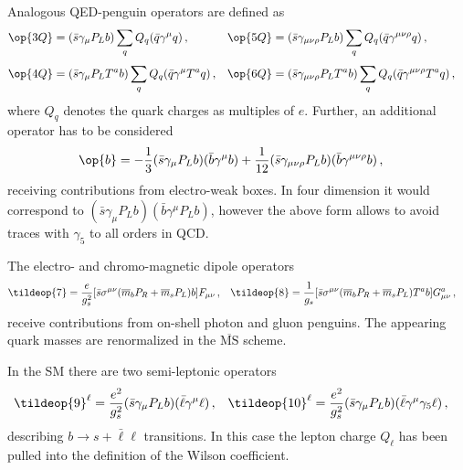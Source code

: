 Analogous QED-penguin operators are defined as 
\begin{equation}
\begin{aligned}
  \op{3Q} & = (\bar{s} \gamma_\mu P_L b)     \sum_q Q_q (\bar{q} \gamma^\mu q) \,, & 
  \op{5Q} & = (\bar{s} \gamma_{\mu\nu\rho} P_L b)
             \sum_q Q_q (\bar{q} \gamma^{\mu\nu\rho} q) \,, &
\\[1mm]   
  \op{4Q} & = (\bar{s} \gamma_\mu P_L T^a b) \sum_q Q_q (\bar{q} \gamma^\mu T^a q) \,, &
  \op{6Q} & = (\bar{s} \gamma_{\mu\nu\rho} P_L T^a b) 
             \sum_q Q_q (\bar{q} \gamma^{\mu\nu\rho} T^a q) \,,
\end{aligned}
\end{equation}
where $Q_q$ denotes the quark charges as multiples of $e$. Further, an additional
operator has to be considered
\begin{align}
  \op{b} & = -\frac{1}{3}  (\bar{s} \gamma_\mu P_L b)(\bar{b} \gamma^\mu b)
             +\frac{1}{12} (\bar{s} \gamma_{\mu\nu\rho} P_L b)
                           (\bar{b} \gamma^{\mu\nu\rho} b) \,,
\end{align}
receiving contributions from electro-weak boxes. In four dimension it would
correspond to $(\bar{s} \gamma_\mu P_L b)(\bar{b} \gamma^\mu P_L b)$, however
the above form allows to avoid traces with $\gamma_5$ to all orders in QCD.

The electro- and chromo-magnetic dipole operators
\begin{align}
  \tildeop{7} & = \frac{e}{g_s^2} [\bar{s} \sigma^{\mu \nu} 
                  (\overline{m}_b P_R + \overline{m}_s P_L) b] F_{\mu \nu} \,, &
  \tildeop{8} & = \frac{1}{g_s}   [\bar{s} \sigma^{\mu \nu}
                  (\overline{m}_b P_R + \overline{m}_s P_L) T^a b] G_{\mu \nu}^a \,, &  
\end{align}
receive contributions from on-shell photon and gluon penguins. The appearing
quark masses are renormalized in the $\overline{\mbox{MS}}$ scheme. 

In the SM there are two semi-leptonic operators
\begin{align}
  \tildeop{9}^{\ell}  & = \frac{e^2}{g_s^2} (\bar{s} \gamma_\mu P_L b) 
                          (\bar{\ell} \gamma^\mu \ell) \,, &
  \tildeop{10}^{\ell} & = \frac{e^2}{g_s^2} (\bar{s} \gamma_\mu P_L b)
                          (\bar{\ell} \gamma^\mu \gamma_5 \ell) \,,
\end{align}
describing $b\to s + \bar\ell\ell$ transitions. In this case the lepton
charge $Q_\ell$ has been pulled into the definition of the Wilson
coefficient.


